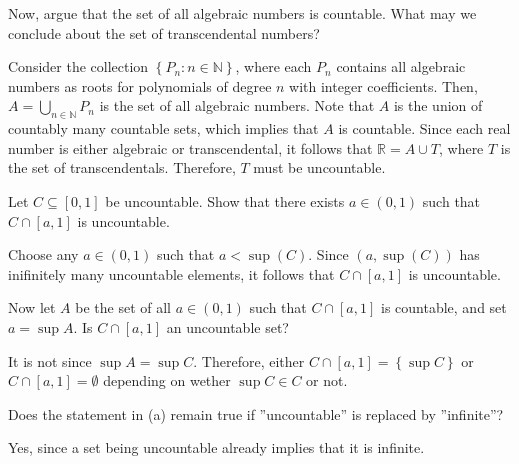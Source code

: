 \documentclass[12pt]{article}
\newcommand{\N}{\mathbb{N}}
\newcommand{\R}{\mathbb{R}}
\newenvironment{problem}[2][Problem]{\begin{trivlist}
		\item[\hskip \labelsep {\bfseries #1}\hskip \labelsep {\bfseries #2.}]}{\end{trivlist}}
\newenvironment{solution}[2][Solution]{\begin{trivlist}
		\item[\hskip \labelsep {\bfseries #1}\hskip \labelsep {\bfseries #2.}]}{\end{trivlist}}
\begin{document}
\begin{problem}{1.5.9}
\begin{enumerate}[label=(\alph*)]
\begin{solution}{(b)}
      \end{solution}
    \item Now, argue that the set of all algebraic numbers is countable. What may we conclude about the set of transcendental numbers?
      \begin{solution}{(c)}
	Consider the collection $\left\{ P_{n}:n\in\N \right\}$, where each $P_{n}$ contains all algebraic numbers as roots for polynomials of degree $n$ with integer coefficients. Then, $A=\bigcup_{n\in\N}P_{n}$ is the set of all algebraic numbers. Note that $A$ is the union of countably many countable sets, which implies that $A$ is countable. Since each real number is either algebraic or transcendental, it follows that $\R=A\cup T$, where $T$ is the set of transcendentals. Therefore, $T$ must be uncountable.
      \end{solution}
  \end{enumerate}
  
\end{problem}

\begin{problem}{1.5.10}
  \begin{enumerate}[label=(\alph*)]
    \item Let $C\subseteq [0,1]$ be uncountable. Show that there exists $a\in(0,1)$ such that $C\cap [a,1]$ is uncountable.
      \begin{solution}{(a)}
	Choose any $a\in (0,1)$ such that $a < \sup(C)$. Since $(a,\sup(C))$ has inifinitely many uncountable elements, it follows that $C\cap [a,1]$ is uncountable. 
      \end{solution}

    \item Now let $A$ be the set of all $a\in(0,1)$ such that $C\cap[a,1]$ is countable, and set $a=\sup A$. Is $C\cap[a,1]$ an uncountable set?
      \begin{solution}{(b)}
	It is not since $\sup A = \sup C$. Therefore, either $C\cap\left[a, 1 \right]=\left\{ \sup C \right\}$ or $C\cap\left[a,1\right]=\emptyset$ depending on wether $\sup C \in C$ or not. 
      \end{solution}

    \item Does the statement in (a) remain true if ''uncountable'' is replaced by ''infinite''?
      \begin{solution}{(c)}
	Yes, since a set being uncountable already implies that it is infinite.
      \end{solution}
  \end{enumerate}
\end{problem}
\end{document}
